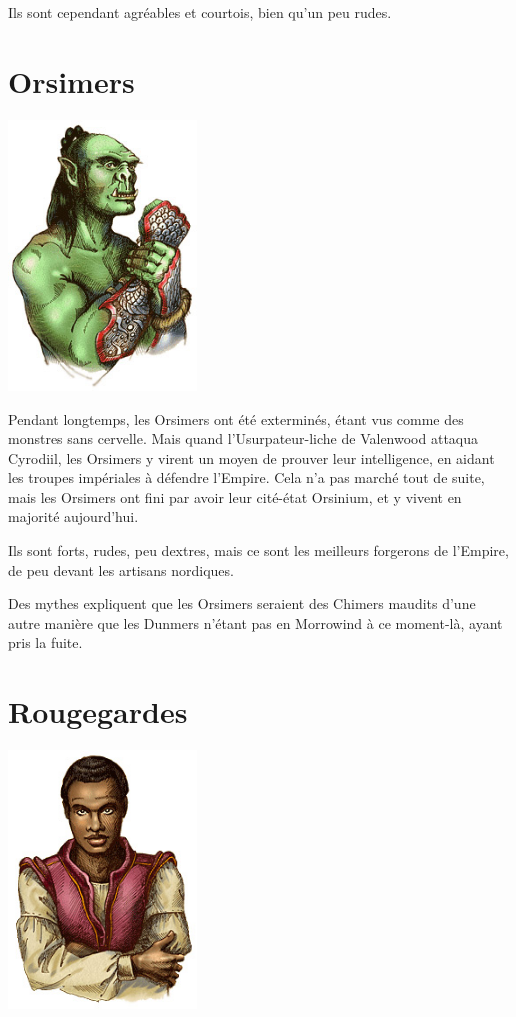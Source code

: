   Ils sont cependant agréables et courtois, bien qu'un peu rudes.

  \section{Orsimers}

  \begin{center}
  \includegraphics[width=5cm]{images/race_orsimer.jpg}
  \end{center}
  
  Pendant longtemps, les Orsimers ont été exterminés, étant vus comme des monstres sans cervelle. Mais quand l'Usurpateur-liche de Valenwood attaqua Cyrodiil, les Orsimers y virent un moyen de prouver leur intelligence, en aidant les troupes impériales à défendre l'Empire. Cela n'a pas marché tout de suite, mais les Orsimers ont fini par avoir leur cité-état Orsinium, et y vivent en majorité aujourd'hui.
  
  Ils sont forts, rudes, peu dextres, mais ce sont les meilleurs forgerons de l'Empire, de peu devant les artisans nordiques.
  
  Des mythes expliquent que les Orsimers seraient des Chimers maudits d'une autre manière que les Dunmers n'étant pas en Morrowind à ce moment-là, ayant pris la fuite.

  \section{Rougegardes}

  \begin{center}
  \includegraphics[width=5cm]{images/race_rougegarde.jpg}
  \end{center}
  
